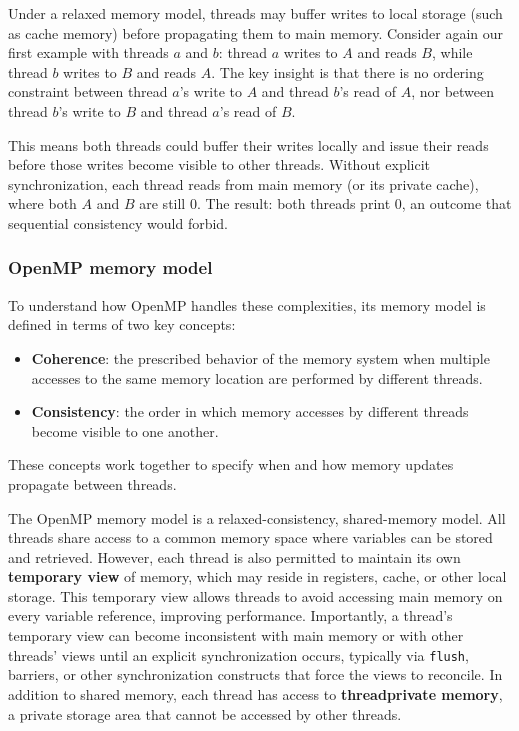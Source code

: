 Under a relaxed memory model, threads may buffer writes to local storage (such as cache memory) before propagating them to main memory. Consider again our first example with threads $a$ and $b$: thread $a$ writes to $A$ and reads $B$, while thread $b$ writes to $B$ and reads $A$. The key insight is that there is no ordering constraint between thread $a$'s write to $A$ and thread $b$'s read of $A$, nor between thread $b$'s write to $B$ and thread $a$'s read of $B$.

This means both threads could buffer their writes locally and issue their reads before those writes become visible to other threads. Without explicit synchronization, each thread reads from main memory (or its private cache), where both $A$ and $B$ are still 0. The result: both threads print 0, an outcome that sequential consistency would forbid.

\subsubsection{OpenMP memory model}

To understand how OpenMP handles these complexities, its memory model is defined in terms of two key concepts:
\begin{itemize}
    \item \textbf{Coherence}: the prescribed behavior of the memory system when multiple accesses to the same memory location are performed by different threads.
    \item \textbf{Consistency}: the order in which memory accesses by different threads become visible to one another.
\end{itemize}
These concepts work together to specify when and how memory updates propagate between threads.

The OpenMP memory model is a relaxed-consistency, shared-memory model. All threads share access to a common memory space where variables can be stored and retrieved. However, each thread is also permitted to maintain its own \textbf{temporary view} of memory, which may reside in registers, cache, or other local storage. This temporary view allows threads to avoid accessing main memory on every variable reference, improving performance. Importantly, a thread's temporary view can become inconsistent with main memory or with other threads' views until an explicit synchronization occurs, typically via \texttt{flush}, barriers, or other synchronization constructs that force the views to reconcile. In addition to shared memory, each thread has access to \textbf{threadprivate memory}, a private storage area that cannot be accessed by other threads.

